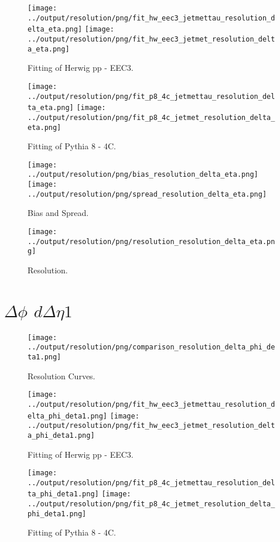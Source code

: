 \documentclass[11pt]{book}
\begin{document}
\begin{figure}[ht]
\centering
\texttt{[image: ../output/resolution/png/fit\_hw\_eec3\_jetmettau\_resolution\_delta\_eta.png]}
\texttt{[image: ../output/resolution/png/fit\_hw\_eec3\_jetmet\_resolution\_delta\_eta.png]}
\caption{Fitting of Herwig pp - EEC3.}
\end{figure}

\begin{figure}[ht]
\centering
\texttt{[image: ../output/resolution/png/fit\_p8\_4c\_jetmettau\_resolution\_delta\_eta.png]}
\texttt{[image: ../output/resolution/png/fit\_p8\_4c\_jetmet\_resolution\_delta\_eta.png]}
\caption{Fitting of Pythia 8 - 4C.}
\end{figure}

\begin{figure}[ht]
\centering
\texttt{[image: ../output/resolution/png/bias\_resolution\_delta\_eta.png]}
\texttt{[image: ../output/resolution/png/spread\_resolution\_delta\_eta.png]}
\caption{Bias and Spread.}
\end{figure}


\begin{figure}[ht]
\centering
\texttt{[image: ../output/resolution/png/resolution\_resolution\_delta\_eta.png]}
\caption{Resolution.}
\end{figure}
\clearpage

\section{$\Delta\phi$ $d\Delta\eta 1$}

\begin{figure}[ht]
\centering
\texttt{[image: ../output/resolution/png/comparison\_resolution\_delta\_phi\_deta1.png]}
\caption{Resolution Curves.}
\end{figure}


\begin{figure}[ht]
\centering
\texttt{[image: ../output/resolution/png/fit\_hw\_eec3\_jetmettau\_resolution\_delta\_phi\_deta1.png]}
\texttt{[image: ../output/resolution/png/fit\_hw\_eec3\_jetmet\_resolution\_delta\_phi\_deta1.png]}
\caption{Fitting of Herwig pp - EEC3.}
\end{figure}

\begin{figure}[ht]
\centering
\texttt{[image: ../output/resolution/png/fit\_p8\_4c\_jetmettau\_resolution\_delta\_phi\_deta1.png]}
\texttt{[image: ../output/resolution/png/fit\_p8\_4c\_jetmet\_resolution\_delta\_phi\_deta1.png]}
\caption{Fitting of Pythia 8 - 4C.}
\end{figure}
\end{document}
